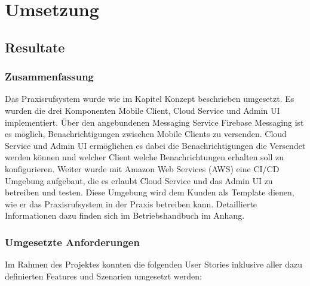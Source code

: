 \section{Umsetzung}\label{sec:umsetzung}

\subsection{Resultate}

\subsubsection{Zusammenfassung}

Das Praxisrufsystem wurde wie im Kapitel Konzept beschrieben umgesetzt.
Es wurden die drei Komponenten Mobile Client, Cloud Service und Admin UI implementiert.
Über den angebundenen Messaging Service Firebase Messaging ist es möglich, Benachrichtigungen zwischen Mobile Clients zu versenden.
Cloud Service und Admin UI ermöglichen es dabei die Benachrichtigungen die Versendet werden können und welcher Client welche Benachrichtungen erhalten soll zu konfigurieren.
Weiter wurde mit Amazon Web Services (AWS) eine CI/CD Umgebung aufgebaut, die es erlaubt Cloud Service und das Admin UI zu betreiben und testen.
Diese Umgebung wird dem Kunden als Template dienen, wie er das Praxisrufsystem in der Praxis betreiben kann.
Detaillierte Informationen dazu finden sich im Betriebshandbuch im Anhang.


\subsubsection{Umgesetzte Anforderungen}

Im Rahmen des Projektes konnten die folgenden User Stories inklusive aller dazu definierten Features und Szenarien umgesetzt werden:

